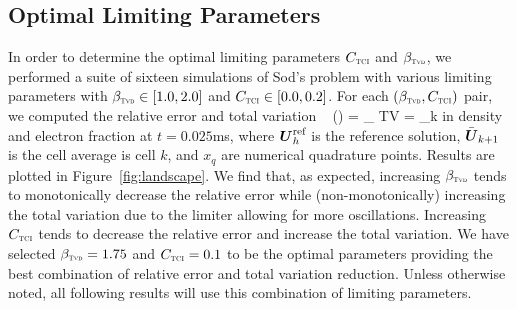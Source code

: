 \documentclass[onecolumn]{aastex62}
\newcommand{\TVD}{\textnormal{\tiny\textsc{Tvd}}}
\newcommand{\TCI}{\textnormal{\tiny\textsc{TCI}}}
\begin{document}
\subsection{Optimal Limiting Parameters}
\label{sec:param}
In order to determine the optimal limiting parameters $C_{\TCI}$ and $\beta_{\TVD}$,
we performed a suite of sixteen simulations of Sod's problem with various
limiting parameters with $\beta_{\TVD}\in\left[1.0,2.0\right]$ and
$C_{\TCI}\in\left[0.0,0.2\right]$. For each $\left(\beta_{\TVD},C_{\TCI}\right)$ pair,
we computed the relative error and total variation \
\beq
  \varepsilon() = \sum_{\bK}\left\lvert{}\right\rvert \quad\quad
  TV = \sum_{k}\abs{ \bar{\vect{U}}_{k+1} - \bar{\vect{U}}_{k} }
\eeq
 in density and electron
fraction at $t = 0.025$ms, where $\boldsymbol{U}_{h}^{\text{ref}} $ is the reference
solution, $\bar{\boldsymbol{U}}_{k+1}$ is the cell average is cell $k$, and $x_{q}$ are
numerical quadrature points.
Results are plotted in Figure~\ref{fig:landscape}.
We find that, as expected, increasing $\beta_{\TVD}$ tends to monotonically
decrease the relative error while (non-monotonically) increasing the total variation due to the
limiter allowing for more oscillations. Increasing $C_{\TCI}$ tends to decrease
the relative error and increase the total variation.
We have selected
$\beta_{\TVD}=1.75$ and $C_{\TCI}=0.1$ to be the optimal parameters providing
the best combination of relative error and total variation reduction. Unless
otherwise noted, all following results will use this combination of limiting
parameters.
\end{document}
